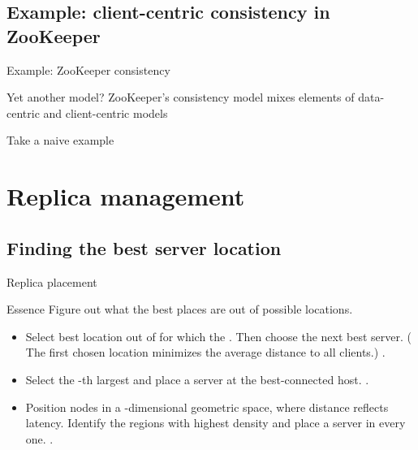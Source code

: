 \subsection{Example: client-centric consistency in ZooKeeper}
\begin{slide}{Example: ZooKeeper consistency}
  \begin{block}{Yet another model?}
    ZooKeeper's consistency model mixes elements of data-centric and client-centric models
  \end{block}
  \begin{exampleblock}{Take a naive example}
    \begin{centerfig}
    \end{centerfig}
  \end{exampleblock}
\end{slide}
\section{Replica management}
\subsection{Finding the best server location}
\begin{slide}{Replica placement}
  \begin{block}{Essence}
    Figure out what the best  places are out of  possible locations.
    \begin{itemize}
    \item Select best location out of  for which the . Then choose the next best server. ( The first chosen location minimizes the
      average distance to all clients.) .
    \item Select the -th largest  and place a server at the
      best-connected host. .
    \item Position nodes in a -dimensional geometric space, where distance reflects
      latency. Identify the  regions with highest density and place a server in every
      one. .
    \end{itemize}
  \end{block}
\end{slide}
